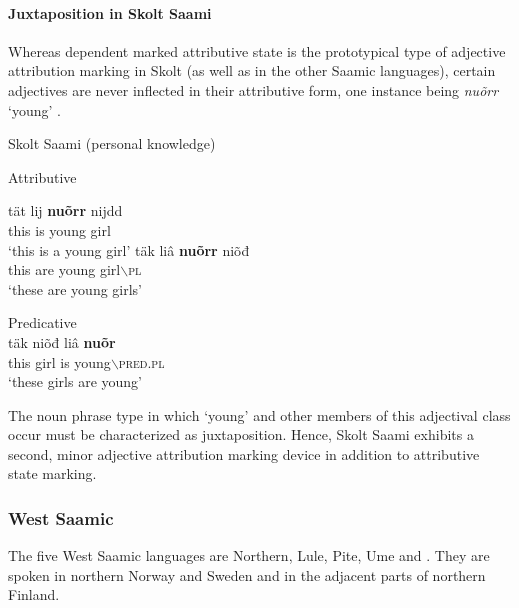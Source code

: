 \paragraph*{Juxtaposition in Skolt Saami}
Whereas dependent marked attributive state is the prototypical type of adjective attribution marking in Skolt (as well as in the other Saamic languages), certain adjectives are never inflected in their attributive form, one instance being \textit{nuõrr} ‘young’ \citep[cf.~also][176]{feist2015a}.
\begin{exe}
\ex \rm{Skolt Saami (personal knowledge)}
\begin{xlist}
\ex \rm{Attributive}
\begin{xlist}
\gll 	tät lij \textbf{nuõrr} nijdd\\
	this is young girl\\
\glt	‘this is a young girl’
\ex	
\gll	täk liâ \textbf{nuõrr} niõđ\\
	this are young girl$\backslash$\textsc{pl}\\
\glt	‘these are young girls’
\end{xlist}
\ex \rm{Predicative}\\
\gll	täk niõđ liâ \textbf{nuõr}\\
	this girl is young$\backslash$\textsc{pred.pl}\\
\glt	‘these girls are young’
\end{xlist}
\end{exe}
The noun phrase type in which ‘young’ and other members of this adjectival class occur must be characterized as {juxtaposition}. Hence, Skolt Saami exhibits a second, minor adjective attribution marking device in addition to attributive state marking.

\subsubsection{West Saamic}
The five West Saamic languages are Northern, Lule, Pite, Ume and . They are spoken in northern Norway and Sweden and in the adjacent parts of northern Finland.


